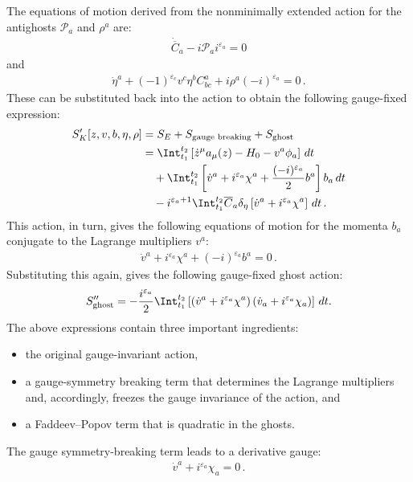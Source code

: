     The equations of motion derived from the nonminimally extended action for the antighosts $\mathcal{P}_a$ and $\rho^a$ are:
    \begin{gather}
        \dot{\overline{C}}_a -i\mathcal{P}_ai^{\varepsilon_a}=0
    \end{gather}
    and
    \begin{gather}
        \dot{\eta}^a + (-1)^{\varepsilon_c}v^c\eta^bC^a_{bc}+i\rho^a(-i)^{\varepsilon_a}=0\,.
    \end{gather}
    These can be substituted back into the action to obtain the following gauge-fixed expression:
    \begin{gather}
        \label{constraint:FP_action}
        \begin{aligned}
            S'_K[z,v,b,\eta,\rho] &= S_E + S_{\text{gauge breaking}} + S_{\text{ghost}}\\
            &= \Int_{t_1}^{t_2}\left[\dot{z}^\mu a_\mu(z) - H_0 - v^a\phi_a\right]\,dt\\
            &\quad+ \Int_{t_1}^{t_2}\left[\dot{v}^a+i^{\varepsilon_a}\chi^a+\frac{(-i)^{\varepsilon_a}}{2}b^a\right]b_a\,dt\\
            &\quad -i^{\varepsilon_a+1}\Int_{t_1}^{t_2}\overline{C}_a\delta_\eta\left[\dot{v}^a+i^{\varepsilon_a}\chi^a\right]\,dt\,.
        \end{aligned}
    \end{gather}
    This action, in turn, gives the following equations of motion for the momenta $b_a$ conjugate to the Lagrange multipliers $v^a$:
    \begin{gather}
        \dot{v}^a+i^{\varepsilon_a}\chi^a+(-i)^{\varepsilon_a}b^a = 0\,.
    \end{gather}
    Substituting this again, gives the following gauge-fixed ghost action:
    \begin{gather}
        S''_{\text{ghost}} = -\frac{i^{\varepsilon_a}}{2}\Int_{t_1}^{t_2}\left[\left(\dot{v}^a + i^{\varepsilon_a}\chi^a\right)\left(\dot{v}_a + i^{\varepsilon_a}\chi_a\right)\right]\,dt.
    \end{gather}
    The above expressions contain three important ingredients:
    \begin{itemize}
        \item the original gauge-invariant action,
        \item a gauge-symmetry breaking term that determines the Lagrange multipliers and, accordingly, freezes the gauge invariance of the action, and
        \item a Faddeev--Popov term that is quadratic in the ghosts.
    \end{itemize}
    The gauge symmetry-breaking term leads to a derivative gauge:
    \begin{gather}
        \label{constraint:derivative_gauge}
        \dot{v}^a + i^{\varepsilon_a}\chi_a = 0\,.
    \end{gather}

